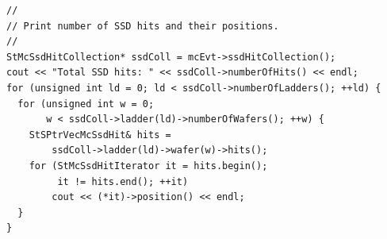 \begin{Entry}
\item[Examples]
{\footnotesize
\begin{verbatim}
//
// Print number of SSD hits and their positions.
//
StMcSsdHitCollection* ssdColl = mcEvt->ssdHitCollection();
cout << "Total SSD hits: " << ssdColl->numberOfHits() << endl;
for (unsigned int ld = 0; ld < ssdColl->numberOfLadders(); ++ld) {
  for (unsigned int w = 0;
       w < ssdColl->ladder(ld)->numberOfWafers(); ++w) {
    StSPtrVecMcSsdHit& hits =
        ssdColl->ladder(ld)->wafer(w)->hits();
    for (StMcSsdHitIterator it = hits.begin();
         it != hits.end(); ++it)
        cout << (*it)->position() << endl;
  }
}
\end{verbatim}
}%
\end{Entry}
\clearpage

%
%
